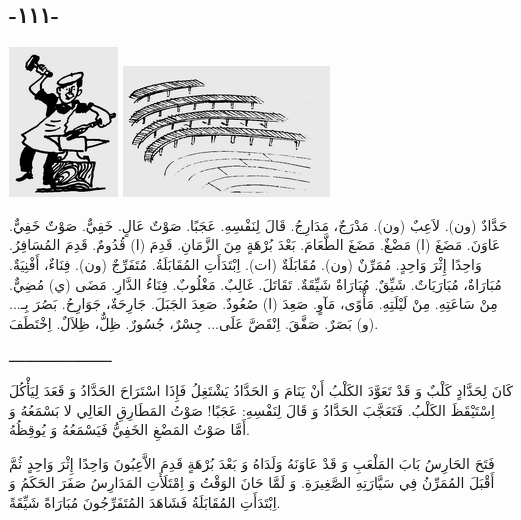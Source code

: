 \documentclass[a5paper]{article}
\begin{document}
\subsection[-١١١-]{-١١١-}
 \includegraphics[width=1.1354in,height=1.5626in]{MuhammadBagauddinlatinized-img287.png}   \includegraphics[width=2.1563in,height=1.3646in]{MuhammadBagauddinlatinized-img288.png} 

حَدَّادٌ (ون). لاَعِبٌ (ون). مَدْرَجٌ، مَدَارِجُ. قَالَ لِنَفْسِهِ. عَجَبًا. صَوْتٌ عَالٍ. خَفِيٌّ. صَوْتٌ خَفِيٌّ. عَاوَنَ. مَضَغَ (ا) مَضْغٌ. مَضَغَ الطَّعَامَ. بَعْدَ بُرْهَةٍ مِنَ الزَّمَانِ. قَدِمَ (ا) قُدُومٌ. قَدِمَ المُسَافِرُ. وَاحِدًا إِثْرَ وَاحِدٍ. مُمَرِّنٌ (ون). مُقَابَلَةٌ (ات). اِبْتَدَأَتِ المُقَابَلَةُ. مُتَفَرِّجٌ (ون). فِنَاءٌ، أَفْنِيَةٌ. مُبَارَاةٌ، مُبَارَيَاتٌ. شَيِّقٌ. مُبَارَاةٌ شَيِّقَةٌ. تَقَاتَلَ. غَالِبٌ. مَغْلُوبٌ. فِنَاءُ الدَّارِ. مَضَى (ي) مُضِيٌّ. مِنْ سَاعَتِهِ. مِنْ لَيْلَتِهِ. مَأْوًى، مَآوٍ. صَعِدَ (ا) صُعُودٌ. صَعِدَ الجَبَلَ. جَارِحَةٌ، جَوَارِحُ. بَصُرَ بِـ... (و) بَصَرٌ. صَفَّقَ. اِنْقَضَّ عَلَى... جِسْرٌ، جُسُورٌ. ظِلٌّ، ظِلاَلٌ. اِخْتَطَفَ.

ـــــــــــــــــــــــــ

كَانَ لِحَدَّادٍ كَلْبٌ وَ قَدْ تَعَوَّدَ الكَلْبُ أَنْ يَنَامَ وَ الحَدَّادُ يَشْتَغِلُ فَإِذَا اسْتَرَاحَ الحَدَّادُ وَ قَعَدَ لِيَأْكُلَ اِسْتَيْقَظَ الكَلْبُ. فَتَعَجَّبَ الحَدَّادُ وَ قَالَ لِنَفْسِهِ: عَجَبًا! صَوْتُ المَطَارِقِ العَالِي لا بَسْمَعُهُ وَ أَمَّا صَوْتُ المَضْغِ الخَفِيُّ فَيَسْمَعُهُ وَ يُوقِظُهُ.

فَتَحَ الحَارِسُ بَابَ المَلْعَبِ وَ قَدْ عَاوَنَهُ وَلَدَاهُ وَ بَعْدَ بُرْهَةٍ قَدِمَ الاَّعِبُونَ وَاحِدًا إِثْرَ وَاحِدٍ ثُمَّ أَقْبَلَ المُمَرِّنُ فِي سَيَّارَتِهِ الصَّغِيرَةِ. وَ لَمَّا حَانَ الوَقْتُ وَ اِمْتَلَأَتِ المَدَارِسُ صَفَرَ الحَكَمُ وَ اِبْتَدَأَتِ المُقَابَلَةُ فَشَاهَدَ المُتَفَرِّجُونَ مُبَارَاةً شَيِّقَةً.
\end{document}
